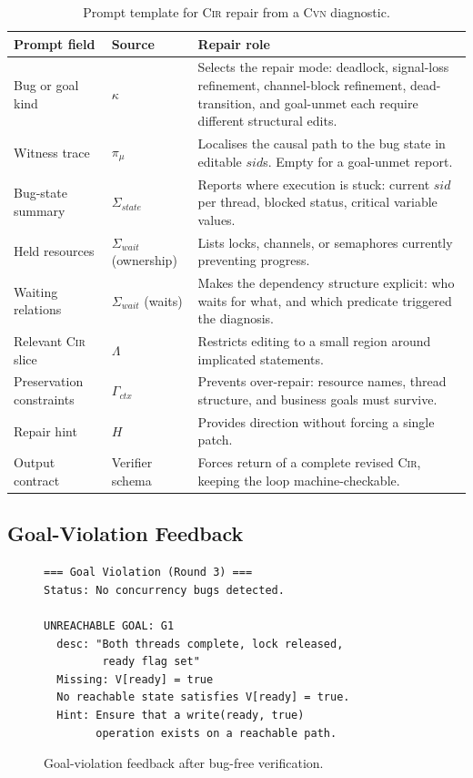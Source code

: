 \documentclass{article}
\begin{document}
\begin{table}[h]
\caption{Prompt template for \textsc{Cir} repair from a \textsc{Cvn}
diagnostic.}
\label{tab:repair-templates}
\centering\small
\begin{tabular}{@{}p{3.0cm}p{4.2cm}p{7.7cm}@{}}
\toprule
\textbf{Prompt field}
  & \textbf{Source}
  & \textbf{Repair role} \\
\midrule
Bug or goal kind
  & $\kappa$
  & Selects the repair mode: deadlock, signal-loss refinement, channel-block refinement, dead-transition, and goal-unmet each require different structural edits. \\
\addlinespace[3pt]
Witness trace
  & $\pi_{\mu}$
  & Localises the causal path to the bug state in editable $\mathit{sid}$s.  Empty for a goal-unmet report. \\
\addlinespace[3pt]
Bug-state summary
  & $\Sigma_{\mathit{state}}$
  & Reports where execution is stuck: current $\mathit{sid}$ per thread, blocked status,
    critical variable values. \\
\addlinespace[3pt]
Held resources
  & $\Sigma_{\mathit{wait}}$ (ownership)
  & Lists locks, channels, or semaphores currently preventing progress. \\
\addlinespace[3pt]
Waiting relations
  & $\Sigma_{\mathit{wait}}$ (waits)
  & Makes the dependency structure explicit: who waits for what, and which predicate triggered the diagnosis. \\
\addlinespace[3pt]
Relevant \textsc{Cir} slice
  & $\Lambda$
  & Restricts editing to a small region around implicated statements. \\
\addlinespace[3pt]
Preservation constraints
  & $\Gamma_{\mathit{ctx}}$
  & Prevents over-repair: resource names, thread structure, and business goals must survive. \\
\addlinespace[3pt]
Repair hint
  & $H$
  & Provides direction without forcing a single patch. \\
\addlinespace[3pt]
Output contract
  & Verifier schema
  & Forces return of a complete revised \textsc{Cir}, keeping the loop machine-checkable. \\
\bottomrule
\end{tabular}
\end{table}

\subsection{Goal-Violation Feedback}

\begin{figure}[h]
\begin{lstlisting}[basicstyle=\small\ttfamily,frame=single]
=== Goal Violation (Round 3) ===
Status: No concurrency bugs detected.

UNREACHABLE GOAL: G1
  desc: "Both threads complete, lock released,
         ready flag set"
  Missing: V[ready] = true
  No reachable state satisfies V[ready] = true.
  Hint: Ensure that a write(ready, true)
        operation exists on a reachable path.
\end{lstlisting}
\caption{Goal-violation feedback after bug-free verification.}
\label{fig:goal-violation}
\end{figure}
\end{document}
